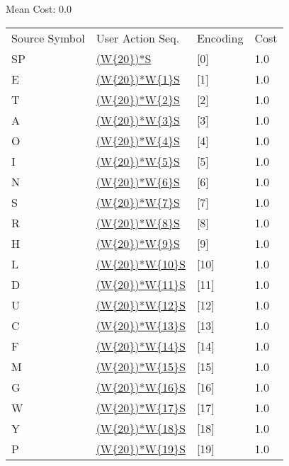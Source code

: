 \documentclass[12pt]{article}
\begin{document}
\noindent
\noindent Mean Cost: 0.0\\
\begin{tabular}{l l l l}
Source Symbol	&	User Action Seq.	&	Encoding	&	Cost\\
SP	&	\url{(W{20})*S}	&	[0]	&	1.0\\
E	&	\url{(W{20})*W{1}S}	&	[1]	&	1.0\\
T	&	\url{(W{20})*W{2}S}	&	[2]	&	1.0\\
A	&	\url{(W{20})*W{3}S}	&	[3]	&	1.0\\
O	&	\url{(W{20})*W{4}S}	&	[4]	&	1.0\\
I	&	\url{(W{20})*W{5}S}	&	[5]	&	1.0\\
N	&	\url{(W{20})*W{6}S}	&	[6]	&	1.0\\
S	&	\url{(W{20})*W{7}S}	&	[7]	&	1.0\\
R	&	\url{(W{20})*W{8}S}	&	[8]	&	1.0\\
H	&	\url{(W{20})*W{9}S}	&	[9]	&	1.0\\
L	&	\url{(W{20})*W{10}S}	&	[10]	&	1.0\\
D	&	\url{(W{20})*W{11}S}	&	[11]	&	1.0\\
U	&	\url{(W{20})*W{12}S}	&	[12]	&	1.0\\
C	&	\url{(W{20})*W{13}S}	&	[13]	&	1.0\\
F	&	\url{(W{20})*W{14}S}	&	[14]	&	1.0\\
M	&	\url{(W{20})*W{15}S}	&	[15]	&	1.0\\
G	&	\url{(W{20})*W{16}S}	&	[16]	&	1.0\\
W	&	\url{(W{20})*W{17}S}	&	[17]	&	1.0\\
Y	&	\url{(W{20})*W{18}S}	&	[18]	&	1.0\\
P	&	\url{(W{20})*W{19}S}	&	[19]	&	1.0\\
\end{tabular}
\end{document}
